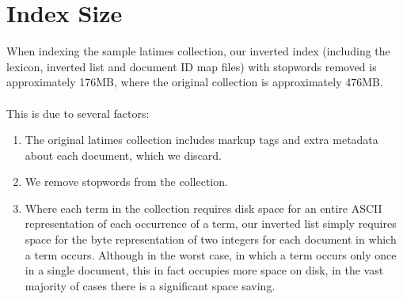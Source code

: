 
\section{Index Size}
\label{sec:indexsize}

When indexing the sample latimes collection, our inverted index (including the lexicon, inverted list and document ID map files) with stopwords removed is approximately 176MB, where the original collection is approximately 476MB.

\paragraph{}
This is due to several factors:

\begin{enumerate}
	\item The original latimes collection includes markup tags and extra metadata about each document, which we discard.
	\item We remove stopwords from the collection.
	\item Where each term in the collection requires disk space for an entire ASCII representation of each occurrence of a term, our inverted list simply requires space for the byte representation of two integers for each document in which a term occurs. Although in the worst case, in which a term occurs only once in a single document, this in fact occupies more space on disk, in the vast majority of cases there is a significant space saving.
\end{enumerate}

